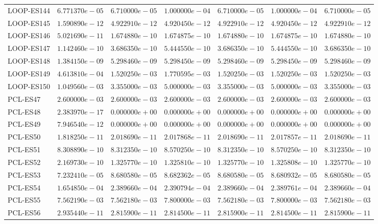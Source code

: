 \begin{longtable}{lrrrrrr}
LOOP-ES144 & $6.771370e-05$ & $6.710000e-05$ & $1.000000e-04$ & $6.710000e-05$ & $1.000000e-04$ & $6.710000e-05$ \\
LOOP-ES145 & $1.590890e-12$ & $4.922910e-12$ & $4.920450e-12$ & $4.922910e-12$ & $4.920450e-12$ & $4.922910e-12$ \\
LOOP-ES146 & $5.021690e-11$ & $1.674880e-10$ & $1.674875e-10$ & $1.674880e-10$ & $1.674875e-10$ & $1.674880e-10$ \\
LOOP-ES147 & $1.142460e-10$ & $3.686350e-10$ & $5.444550e-10$ & $3.686350e-10$ & $5.444550e-10$ & $3.686350e-10$ \\
LOOP-ES148 & $1.384150e-09$ & $5.298460e-09$ & $5.298450e-09$ & $5.298460e-09$ & $5.298450e-09$ & $5.298460e-09$ \\
LOOP-ES149 & $4.613810e-04$ & $1.520250e-03$ & $1.770595e-03$ & $1.520250e-03$ & $1.520250e-03$ & $1.520250e-03$ \\
LOOP-ES150 & $1.049560e-03$ & $3.355000e-03$ & $5.000000e-03$ & $3.355000e-03$ & $5.000000e-03$ & $3.355000e-03$ \\
PCL-ES47 & $2.600000e-03$ & $2.600000e-03$ & $2.600000e-03$ & $2.600000e-03$ & $2.600000e-03$ & $2.600000e-03$ \\
PCL-ES48 & $2.383970e-17$ & $0.000000e+00$ & $0.000000e+00$ & $0.000000e+00$ & $0.000000e+00$ & $0.000000e+00$ \\
PCL-ES49 & $7.946540e-12$ & $0.000000e+00$ & $0.000000e+00$ & $0.000000e+00$ & $0.000000e+00$ & $0.000000e+00$ \\
PCL-ES50 & $1.818250e-11$ & $2.018690e-11$ & $2.017868e-11$ & $2.018690e-11$ & $2.017857e-11$ & $2.018690e-11$ \\
PCL-ES51 & $8.308890e-10$ & $8.312350e-10$ & $8.570250e-10$ & $8.312350e-10$ & $8.570250e-10$ & $8.312350e-10$ \\
PCL-ES52 & $2.169730e-10$ & $1.325770e-10$ & $1.325810e-10$ & $1.325770e-10$ & $1.325808e-10$ & $1.325770e-10$ \\
PCL-ES53 & $7.232410e-05$ & $8.680580e-05$ & $8.682362e-05$ & $8.680580e-05$ & $8.680932e-05$ & $8.680580e-05$ \\
PCL-ES54 & $1.654850e-04$ & $2.389660e-04$ & $2.390794e-04$ & $2.389660e-04$ & $2.389761e-04$ & $2.389660e-04$ \\
PCL-ES55 & $7.562190e-03$ & $7.562180e-03$ & $7.800000e-03$ & $7.562180e-03$ & $7.800000e-03$ & $7.562180e-03$ \\
PCL-ES56 & $2.935440e-11$ & $2.815900e-11$ & $2.814500e-11$ & $2.815900e-11$ & $2.814500e-11$ & $2.815900e-11$ \\

\end{longtable}
